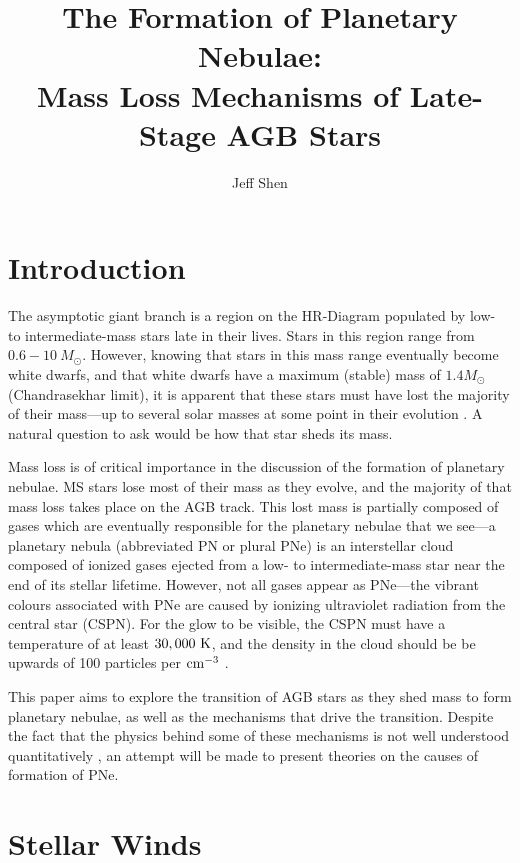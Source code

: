 \documentclass[twocolumn]{aastex63}
\begin{document}
\author{Jeff Shen}
\title{The Formation of Planetary Nebulae: \\
Mass Loss Mechanisms of Late-Stage AGB Stars} 


\section{Introduction} \label{sec:intro}

The asymptotic giant branch is a region on the HR-Diagram populated by low- to intermediate-mass stars late in their lives. Stars in this region range from $0.6-10~M_\odot$. However, knowing that stars in this mass range eventually become white dwarfs, and that white dwarfs have a maximum (stable) mass of $1.4 M_\odot$ (Chandrasekhar limit), it is apparent that these stars must have lost the majority of their mass—up to several solar masses at some point in their evolution \cite{willson}. A natural question to ask would be how that star sheds its mass. 

Mass loss is of critical importance in the discussion of the formation of planetary nebulae. MS stars lose most of their mass as they evolve, and the majority of that mass loss takes place on the AGB track. This lost mass is partially composed of gases which are eventually responsible for the planetary nebulae that we see—a planetary nebula (abbreviated PN or plural PNe) is an interstellar cloud composed of ionized gases ejected from a low- to intermediate-mass star near the end of its stellar lifetime. However, not all gases appear as PNe—the vibrant colours associated with PNe are caused by ionizing ultraviolet radiation from the central star (CSPN). For the glow to be visible, the CSPN must have a temperature of at least $30,000~{\rm K}$, and the density in the cloud should be be upwards of 100 particles per ${\rm cm^{-3}}$ \citep{prialnik}.

This paper aims to explore the transition of AGB stars as they shed mass to form planetary nebulae, as well as the mechanisms that drive the transition. Despite the fact that the physics behind some of these mechanisms is not well understood quantitatively \citep{blocker}, an attempt will be made to present theories on the causes of formation of PNe.

\section{Stellar Winds} \label{sec:winds}
\end{document}
